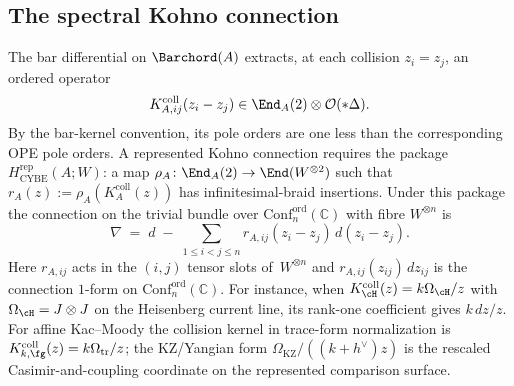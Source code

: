 \subsection*{The spectral Kohno connection}

\begin{construction}
\ClaimStatusConditional
\label{constr:r-matrix-monodromy-vol1}
The bar differential on $\Barchord(A)$ extracts, at each collision
$z_i=z_j$, an ordered operator
\[
 K^{\mathrm{coll}}_{A,ij}(z_i-z_j)
 \in\End_A(2)\otimes\mathcal O(*\Delta).
\]
By the bar-kernel convention, its pole orders are one less than the
corresponding OPE pole orders. A represented Kohno connection requires
the package $H_{\mathrm{CYBE}}^{\mathrm{rep}}(A;W)$: a map
$\rho_A\colon\End_A(2)\to\End(W^{\otimes2})$ such that
$r_A(z):=\rho_A(K_A^{\mathrm{coll}}(z))$ has infinitesimal-braid
insertions. Under this package the connection on the trivial bundle
over $\mathrm{Conf}_n^{\mathrm{ord}}(\mathbb{C})$ with fibre
$W^{\otimes n}$ is
\begin{equation}\label{eq:kohno-connection}
\nabla
\;=\;
d
\;-\;
\sum_{1\leq i<j\leq n}
r_{A,ij}(z_i-z_j)\,d(z_i-z_j).
\end{equation}
Here $r_{A,ij}$ acts in the $(i,j)$ tensor slots of~$W^{\otimes n}$
and $r_{A,ij}(z_{ij})\,dz_{ij}$ is the connection $1$-form
on $\mathrm{Conf}_n^{\mathrm{ord}}(\mathbb{C})$.
For instance, when
$K_{\cH}^{\mathrm{coll}}(z)=k\Omega_{\cH}/z$ with
$\Omega_{\cH}=J\otimes J$ on the Heisenberg current line, its
rank-one coefficient gives $k\,dz/z$. For affine Kac--Moody the
collision kernel in trace-form normalization is
$K_{k,\fg}^{\mathrm{coll}}(z)=k\Omega_{\mathrm{tr}}/z$; the
KZ/Yangian form $\Omega_{\mathrm{KZ}}/((k+h^\vee)z)$ is the rescaled
Casimir-and-coupling coordinate on the represented comparison surface.


\end{construction}

